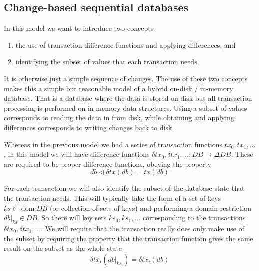 \documentclass[11pt,a4paper]{article}
\DeclareMathOperator{\dom}{dom}
\newcommand\restrict[2]{\left.#1\right|_{#2}}
\begin{document}
\subsection{Change-based sequential databases}

In this model we want to introduce two concepts
\begin{enumerate}
\item the use of transaction difference functions and applying differences; and
\item identifying the subset of values that each transaction needs.
\end{enumerate}
It is otherwise just a simple sequence of changes. The use of these two concepts
makes this a simple but reasonable model of a hybrid on-disk / in-memory
database. That is a database where the data is stored on disk but all
transaction processing is performed on in-memory data structures. Using a subset
of values corresponds to reading the data in from disk, while obtaining and
applying differences corresponds to writing changes back to disk.

Whereas in the previous model we had a series of transaction functions
$\mathit{tx}_0, \mathit{tx}_1, \ldots$, in this model we will have difference
functions
$\delta\mathit{tx}_0, \delta\mathit{tx}_1, \ldots : \mathit{DB} \to \Delta\mathit{DB}$. These are required to be proper difference functions, obeying the property
\begin{equation}
\label{eq:diff-fun}
db \triangleleft \delta\mathit{tx}(\mathit{db}) = \mathit{tx}(\mathit{db})
\end{equation}

For each transaction we will also identify the subset of the database state that
the transaction needs. This will typically take the form of a set of keys
$\mathit{ks} \in \dom{\mathit{DB}}$ (or collection of sets of keys) and
performing a domain restriction $\restrict{\mathit{db}}{\mathit{ks}} \in \mathit{DB}$.
So there will key sets $\mathit{ks}_0, \mathit{ks}_1, \ldots$ corresponding to
the transactions $\delta\mathit{tx}_0, \delta\mathit{tx}_1, \ldots$.
We will require that the transaction really does only make use of the subset
by requiring the property that the transaction function gives the same result
on the subset as the whole state
\begin{equation}
\label{eq:restrict}
  \delta\mathit{tx}_i(\restrict{\mathit{db}}{\mathit{ks}_i}) = \delta\mathit{tx}_i(\mathit{db})
\end{equation}
\end{document}

